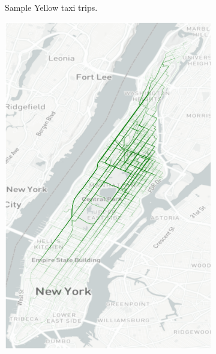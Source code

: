 \documentclass[12pt,notitlepage]{article}
\begin{document}
\begin{figure}[!p]
\begin{subfigure}{0.32\linewidth}
		\caption{Sample Yellow taxi trips.}
	\end{subfigure}
	\hfill
	\begin{subfigure}{0.32\linewidth}
		\includegraphics[width=\textwidth]{20210611-OSM/e_explore/trip_trajectories_ingraph/green_tripdata_2016-05.png}
		

\end{subfigure}
\end{figure}
\end{document}
